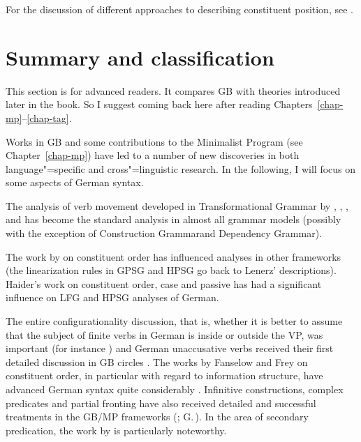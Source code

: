 For the discussion of different approaches to describing constituent position, see 
.




\section{Summary and classification}
\label{sec-summary-gb}

This section is for advanced readers. It compares GB with theories introduced later in the book. So
I suggest coming back here after reading Chapters~\ref{chap-mp}--\ref{chap-tag}.

Works in GB and some contributions to the Minimalist Program (see Chapter~\ref{chap-mp}) have led to a number of new discoveries in both language"=specific and cross"=linguistic research. In
the following, I will focus on some aspects of German syntax.

The analysis of verb movement developed in Transformational Grammar by \citet*[]{Bierwisch63a}, \citet{Reis74a},
\citet{Koster75a}, \citet[Chapter~1]{Thiersch78a} and \citet{denBesten83a} has become the standard analysis in almost
all grammar models (possibly with the exception of Construction Grammar\indexcxg and Dependency Grammar\indexdg).

The work by \citet{Lenerz77} on constituent order has influenced analyses in other frameworks
(the linearization rules in GPSG and HPSG go back to Lenerz' descriptions). Hai\-der's work on constituent order,
case and passive \citeyearpar{Haider84b,Haider85,Haider85b,Haider86,Haider90a,Haider93a} has had a significant influence on LFG
and HPSG analyses of German.

The entire configurationality discussion, that is, whether it is better to assume that the 
subject of finite verbs in German is inside or outside the VP, was important
(for instance \citealp*{Haider82,Grewendorf83a,Kratzer84a,Kratzer96a,Webelhuth85a,%
Sternefeld85b,%
Scherpenisse86a,%
Fanselow87a,Grewendorf88a,Duerscheid89a,Webelhuth90,%
Oppenrieder91a,%
Wilder91a,Haider93a,Grewendorf93,%
Frey93a,%
Lenerz94a,%
Meinunger2000a%
}) and German unaccusative verbs received their first detailed discussion in GB circles 
\citep{Grewendorf89a,Fanselow92}. The works by Fanselow and Frey on constituent order, in 
particular with regard to information structure, have advanced German syntax quite considerably
\citep{Fanselow88,Fanselow90,Fanselow93a,Fanselow2000a,Fanselow2001a,Fanselow2003d,Fanselow2003a,Fanselow2004a,Frey2000a-u,Frey2001a,Frey2004a,Frey2005a}.
Infinitive constructions, complex predicates and partial fronting have also received detailed and successful treatments
in the GB/MP frameworks
(\citealp{Bierwisch63a,Evers75a,Haider82,Haider86c,Haider90b,Haider91,Haider93a,Grewendorf83a,Grewendorf87a,Grewendorf88a,denBesten85b,Sternefeld85b,Fanselow87a,Fanselow2002a,SS88a,BK89a}; G.\,\citealp{GMueller96a,GMueller98a,VS98a}).
In the area of secondary predication, the work by \citet{Winkler97a} is particularly noteworthy.


